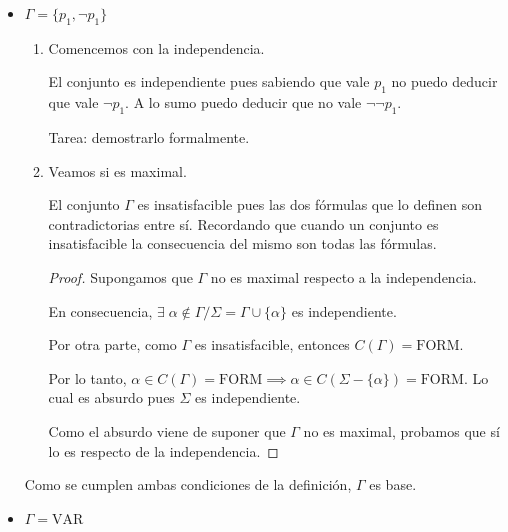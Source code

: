 \begin{itemize}
    \item $\Gamma = \{ p_1, \neg p_1 \}$

        \begin{enumerate}
            \item Comencemos con la independencia.

                El conjunto es independiente pues sabiendo que vale $p_1$ no
                puedo deducir que vale $\neg p_1$. A lo sumo puedo deducir 
                que no vale $\neg \neg p_1$.

                Tarea: demostrarlo formalmente.

            \item Veamos si es maximal.

                El conjunto $\Gamma$ es insatisfacible pues las dos fórmulas
                que lo definen son contradictorias entre sí. Recordando
                que cuando un conjunto es insatisfacible la consecuencia del 
                mismo son todas las fórmulas.


                \begin{proof} \phantom{.}
                
                    Supongamos que $\Gamma$ no es maximal respecto a la 
                    independencia.

                    En consecuencia, $\exists \; \alpha \notin \Gamma /
                    \Sigma=\Gamma \cup \{ \alpha \}$ es independiente.

                    Por otra parte, como $\Gamma$ es insatisfacible, entonces 
                    $C(\Gamma)=\mathrm{FORM}$.

                    Por lo tanto, $\alpha \in C(\Gamma) = \mathrm{FORM} \implies
                    \alpha \in C(\Sigma - \{ \alpha \}) = \mathrm{FORM}$. Lo cual es
                    absurdo pues $\Sigma$ es independiente.

                    Como el absurdo viene de suponer que $\Gamma$ no es
                    maximal, probamos que sí lo es respecto de la 
                    independencia.

                \end{proof}

        \end{enumerate}

        Como se cumplen ambas condiciones de la definición, $\Gamma$ es base.

    \item $\Gamma = \mathrm{VAR}$


\end{itemize}
